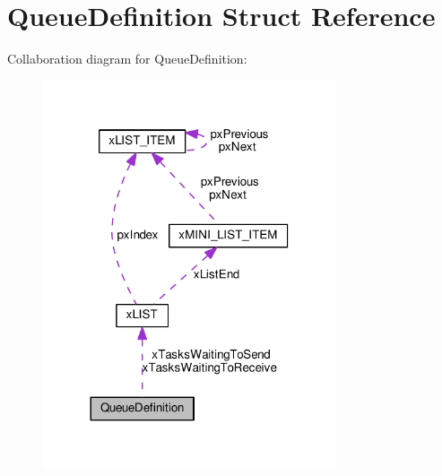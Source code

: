 \hypertarget{struct_queue_definition}{}\section{Queue\+Definition Struct Reference}
\label{struct_queue_definition}


Collaboration diagram for Queue\+Definition\+:\nopagebreak
\begin{figure}[H]
\begin{center}
\leavevmode
\includegraphics[width=245pt]{struct_queue_definition__coll__graph}
\end{center}
\end{figure}
